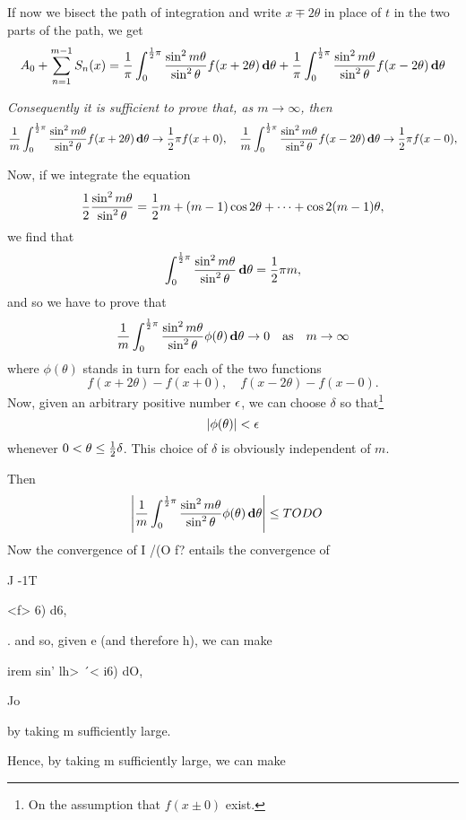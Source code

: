 If now we bisect the path of integration and write $x \mp 2\theta$ in place of
$t$ in the two parts of the path, we get
$$
A_{0}
+ \sum_{n=1}^{m-1} S_{n}(x)
=
\frac{1}{\pi}
\int_{0}^{\frac{1}{2} \pi}
\frac{\sin^{2} m \theta}{\sin^{2} \theta}
f(x + 2\theta) \, \mathbf{d} \theta
+
\frac{1}{\pi}
\int_{0}^{\frac{1}{2} \pi}
\frac{\sin^{2} m \theta}{\sin^{2} \theta}
f(x - 2\theta) \, \mathbf{d} \theta
$$

\emph{Consequently it is sufficient to prove that, as
  $m \rightarrow \infty$, then}
$$
\frac{1}{m}
\int_{0}^{\frac{1}{2}\pi}
\frac{\sin^{2} m \theta}{\sin^{2} \theta}
f(x + 2\theta)
\, \mathbf{d} \theta
\rightarrow
\frac{1}{2} \pi f(x + 0),
\quad
\frac{1}{m}
\int_{0}^{\frac{1}{2}\pi}
\frac{\sin^{2} m \theta}{\sin^{2} \theta}
f(x - 2\theta)
\, \mathbf{d} \theta
\rightarrow
\frac{1}{2} \pi f(x - 0),
$$
%
%

Now, if we integrate the equation
$$
\frac{1}{2}
\frac{\sin^{2} m \theta}{\sin^{2} \theta}
=
\frac{1}{2} m + (m-1) \cos 2\theta + \cdots + \cos 2(m-1)\theta,
$$
we find that
$$
\int_{0}^{\frac{1}{2} \pi}
\frac{\sin^{2} m \theta}{\sin^{2} \theta}
\, \mathbf{d} \theta
=
\frac{1}{2} \pi m,
$$
and so we have to prove that
$$
\frac{1}{m}
\int_{0}^{\half \pi}
\frac{\sin^{2} m \theta}{\sin^{2} \theta}
\phi(\theta)
\dmeasure \theta
\rightarrow
0
\quad
\textrm{as} %
\quad
m \rightarrow \infty
$$
where $\phi(\theta)$ stands in turn for each of the two functions
$$
f(x + 2\theta) - f(x + 0),
\quad
f(x - 2\theta) - f(x - 0).
$$
Now, given an arbitrary positive number $\epsilon$, we can choose $\delta$ so
that\footnote{On the assumption that $f(x \pm 0)$ exist.}
$$
\left| \phi(\theta) \right| < \epsilon
$$
whenever $0 < \theta \leq \frac{1}{2} \delta$. This choice of $\delta$ is obviously independent of $m$.

Then
\begin{align*}
  \left| 
    \frac{1}{m}
    \int_{0}^{\frac{1}{2} \pi}
    \frac{\sin^{2} m\theta}{\sin^{2} \theta}
    \phi(\theta)
    \, \mathbf{d} \theta
   \right|
  &
  \leq
  TODO
\end{align*}
Now the convergence of I /(O f? entails the convergence of

J -1T

<f> 6) d6,

. and so, given e (and therefore h), we can make

 irem sin' lh> \'\ < i6) dO,

Jo

by taking m sufficiently large.

Hence, by taking m sufficiently large, we can make

